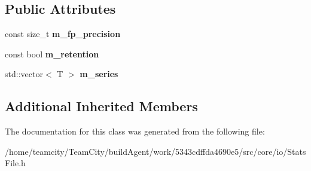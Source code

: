 \subsection*{Public Attributes}
\begin{DoxyCompactItemize}
\item 
const size\+\_\+t {\bfseries m\+\_\+fp\+\_\+precision}\hypertarget{classStatsField_ad94f3f7d0aef955859d49274f7c36dbe}{}\label{classStatsField_ad94f3f7d0aef955859d49274f7c36dbe}

\item 
const bool {\bfseries m\+\_\+retention}\hypertarget{classStatsField_ab466dc83222bb8799b6083c5207a5cd0}{}\label{classStatsField_ab466dc83222bb8799b6083c5207a5cd0}

\item 
std\+::vector$<$ T $>$ {\bfseries m\+\_\+series}\hypertarget{classStatsField_a817f870816875db593f32c53c0c6980d}{}\label{classStatsField_a817f870816875db593f32c53c0c6980d}

\end{DoxyCompactItemize}
\subsection*{Additional Inherited Members}


The documentation for this class was generated from the following file\+:\begin{DoxyCompactItemize}
\item 
/home/teamcity/\+Team\+City/build\+Agent/work/5343cdffda4690e5/src/core/io/Stats\+File.\+h\end{DoxyCompactItemize}
